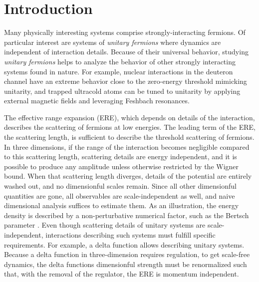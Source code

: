 \section{Introduction}\label{sec:intro}

Many physically interesting systems comprise strongly-interacting fermions.
Of particular interest are systems of \emph{unitary fermions} where dynamics are independent of interaction details.
Because of their universal behavior, studying \emph{unitary fermions} helps to analyze the behavior of other strongly interacting systems found in nature.
For example, nuclear interactions in the deuteron channel have an extreme behavior close to the zero-energy threshold mimicking unitarity, and trapped ultracold atoms can be tuned to unitarity by applying external magnetic fields and leveraging Feshbach resonances.

The effective range expansion (ERE), which depends on details of the interaction, describes the scattering of fermions at low energies.
The leading term of the ERE, the scattering length, is sufficient to describe the threshold scattering of fermions.
In three dimensions, if the range of the interaction becomes negligible compared to this scattering length, scattering details are energy independent, and it is possible to produce any amplitude unless otherwise restricted by the Wigner bound\cite{Wigner:1955zz, Phillips:1996ae, Hammer:2010fw}.
When that scattering length diverges, details of the potential are entirely washed out, and no dimensionful scales remain.
Since all other dimensionful quantities are gone, all observables are scale-independent as well, and naive dimensional analysis suffices to estimate them.
As an illustration, the energy density is described by a non-perturbative numerical factor, such as the Bertsch parameter\cite{PhysRevC.60.054311} .
Even though scattering details of unitary systems are scale-independent, interactions describing such systems must fulfill specific requirements.
For example, a delta function allows describing unitary systems.
Because a delta function in three-dimension requires regulation, to get scale-free dynamics, the delta functions dimensionful strength must be renormalized such that, with the removal of the regulator, the ERE is momentum independent.

